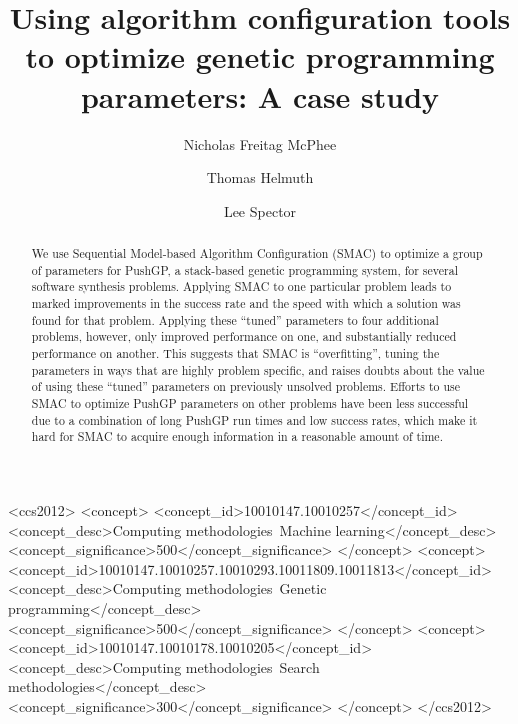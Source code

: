 \documentclass[sigconf]{acmart}
\begin{document}
\title[Using algorithm configuration tools to optimize genetic programming parameters]{Using algorithm configuration tools to optimize genetic programming parameters: A case study}

\author{Nicholas Freitag McPhee}

\author{Thomas Helmuth}

\author{Lee Spector}

\begin{abstract}
	We use 
	Sequential Model-based Algorithm Configuration (SMAC) to optimize
	a group of parameters for PushGP, a stack-based genetic programming
	system, for
	several software synthesis problems. Applying
	SMAC to one particular problem leads
	to marked improvements in the success rate and the speed with which
	a solution was found for that problem. Applying these ``tuned'' 
	parameters to four
	additional problems, however, only improved performance on one, and
	substantially reduced performance on another. This suggests that SMAC 
	is ``overfitting'', tuning the parameters in ways that are 
	highly problem specific, and raises doubts about the value of
	using these ``tuned'' parameters on  previously unsolved problems.
	Efforts to use SMAC to optimize PushGP parameters on other problems
	have been less successful due to a combination of long PushGP run times
	and low success rates, which make it hard for SMAC to acquire enough
	information in a reasonable amount of time.
\end{abstract}

%
%
\begin{CCSXML}
	<ccs2012>
	<concept>
	<concept_id>10010147.10010257</concept_id>
	<concept_desc>Computing methodologies~Machine learning</concept_desc>
	<concept_significance>500</concept_significance>
	</concept>
	<concept>
	<concept_id>10010147.10010257.10010293.10011809.10011813</concept_id>
	<concept_desc>Computing methodologies~Genetic programming</concept_desc>
	<concept_significance>500</concept_significance>
	</concept>
	<concept>
	<concept_id>10010147.10010178.10010205</concept_id>
	<concept_desc>Computing methodologies~Search methodologies</concept_desc>
	<concept_significance>300</concept_significance>
	</concept>
	</ccs2012>
\end{CCSXML}
\end{document}
